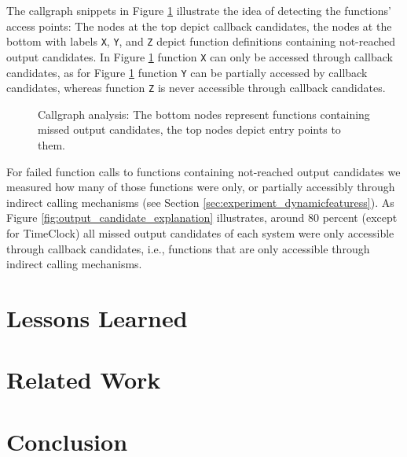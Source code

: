 \documentclass[sigconf]{acmart}
\renewcommand{\sf}[1]{\textsf{#1}}
\renewcommand{\tt}[1]{\texttt{#1}}
\begin{document}
The callgraph snippets in Figure \ref{fig:callgraph} illustrate the idea of
detecting the functions’ access points: The nodes at the top depict callback
candidates, the nodes at the bottom with labels \tt{X}, \tt{Y}, and \tt{Z}
depict function definitions containing not-reached output candidates. In Figure
\ref{fig:callgraph} function \tt{X} can only be accessed through callback
candidates, as for Figure \ref{fig:callgraph} function \tt{Y} can be partially
accessed by callback candidates, whereas function \tt{Z} is never accessible
through callback candidates.

\begin{figure}
    
    \caption{Callgraph analysis: The bottom nodes represent functions
    containing missed output candidates, the top nodes depict entry points to
    them.}
    \label{fig:callgraph} 
\end{figure}


For failed function calls to functions containing not-reached output
candidates we measured how many of those functions were only, or
partially accessibly through indirect calling mechanisms (see Section
\ref{sec:experiment_dynamicfeaturess}). As Figure
\ref{fig:output_candidate_explanation} illustrates, around 80 percent (except
for \sf{TimeClock}) all missed output candidates of each system were only
accessible through callback candidates, i.e., functions that are only
accessible through indirect calling mechanisms.

\section{Lessons Learned}


\section{Related Work} \label{sec:related_work}
\cite{Hills:2013:ESP:2483760.2483786}
\cite{wassermann2007sound,minamide2005static}

\section{Conclusion}


 
\end{document}

